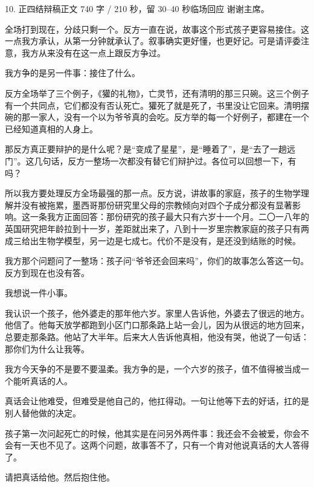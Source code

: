 \documentclass[script,pro]{debate}
\begin{document}
\begin{speech}{10. 正四结辩稿}{正文 740 字 / 210 秒，留 30–40 秒临场回应}
谢谢主席。


全场打到现在，分歧只剩一个。反方一直在说，故事这个形式孩子更容易接住。这一点我方承认，从第一分钟就承认了。叙事确实更好懂，也更好记。可是请评委注意，我方从来没有在这一点上跟反方争过。

我方争的是另一件事：接住了什么。

反方全场举了三个例子，《獾的礼物》，亡灵节，还有清明的那三只碗。这三个例子有一个共同点，它们都没有否认死亡。獾死了就是死了，书里没让它回来。清明摆碗的那一家人，没有一个以为爷爷真的会吃。反方举的每一个好例子，都建在一个已经知道真相的人身上。

那反方真正要辩护的是什么呢？是“变成了星星”，是“睡着了”，是“去了一趟远门”。这几句话，反方一整场一次都没有替它们辩护过。各位可以回想一下，有吗？

所以我方要处理反方全场最强的那一点。反方说，讲故事的家庭，孩子的生物学理解并没有被拖累，墨西哥那份研究里父母的宗教倾向对四个子成分都没有显著影响。这一条我方正面回答：那份研究的孩子最大只有六岁十一个月。二〇一八年的英国研究把年龄拉到十一岁，差距就出来了，八到十一岁里宗教家庭的孩子只有两成三给出生物学模型，另一边是七成七。代价不是没有，是还没到结账的时候。

我方那个问题问了一整场：孩子问“爷爷还会回来吗”，你们的故事怎么答这一句。反方到现在也没有答。


我想说一件小事。

我认识一个孩子，他外婆走的那年他六岁。家里人告诉他，外婆去了很远的地方。他信了。他每天放学都跑到小区门口那条路上站一会儿，因为从很远的地方回来，总要走那条路。他站了大半年。后来大人告诉他真相，他没有哭，他说了一句话：那你们为什么让我等。

我方今天争的不是要不要温柔。我方争的是，一个六岁的孩子，值不值得被当成一个能听真话的人。

真话会让他难受，但难受是他自己的，他扛得动。一句让他等下去的好话，扛的是别人替他做的决定。

孩子第一次问起死亡的时候，他其实是在问另外两件事：我还会不会被爱，你会不会有一天也不见了。这两个问题，故事答不了，只有一个肯对他说真话的大人答得了。

请把真话给他。然后抱住他。

\begin{contingency}
\end{contingency}
\end{speech}
\end{document}
